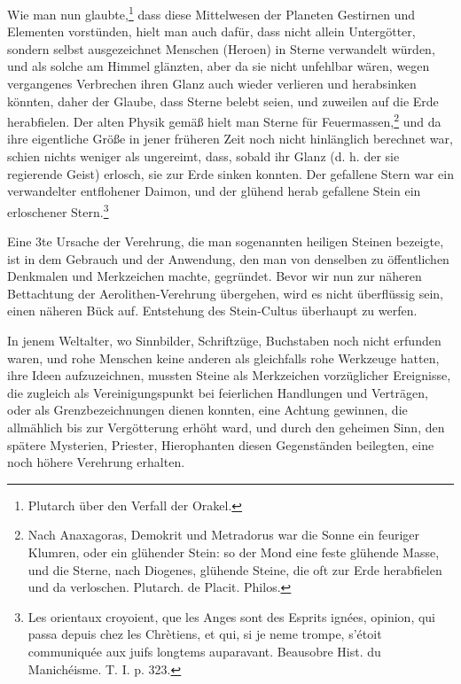 \documentclass[a4paper, 11pt, oneside, polutonikogreek, german]{article}
\begin{document}
Wie man nun glaubte,\footnote{Plutarch über den Verfall der Orakel.} dass diese Mittelwesen der Planeten Gestirnen und Elementen vorstünden, hielt man auch dafür, dass nicht allein Untergötter, sondern selbst ausgezeichnet Menschen (Heroen) in Sterne verwandelt würden, und als solche am Himmel glänzten, aber da sie nicht unfehlbar wären, wegen vergangenes Verbrechen ihren Glanz auch wieder verlieren und herabsinken könnten, daher der Glaube, dass Sterne belebt seien, und zuweilen auf die Erde herabfielen. Der alten Physik gemäß hielt man Sterne für Feuermassen,\footnote{Nach Anaxagoras, Demokrit und Metradorus war die Sonne ein feuriger Klumren, oder ein glühender Stein: so der Mond eine feste glühende Masse, und die Sterne, nach Diogenes, glühende Steine, die oft zur Erde herabfielen und da verloschen. Plutarch. de Placit. Philos.} und da ihre eigentliche Größe in jener früheren Zeit noch nicht hinlänglich berechnet war, schien nichts weniger als ungereimt, dass, sobald ihr Glanz (d. h. der sie regierende Geist) erlosch, sie zur Erde sinken konnten. Der gefallene Stern war ein verwandelter entflohener Daimon, und der glühend herab gefallene Stein ein erloschener Stern.\footnote{Les orientaux croyoient, que les Anges sont des Esprits ignées, opinion, qui passa depuis chez les Chrètiens, et qui, si je neme trompe, s'étoit communiquée aux juifs longtems auparavant. Beausobre Hist. du Manichéisme. T. I. p. 323.}

Eine 3te Ursache der Verehrung, die man sogenannten heiligen Steinen bezeigte, ist in dem Gebrauch und der Anwendung, den man von denselben zu öffentlichen Denkmalen und Merkzeichen machte, gegründet. Bevor wir nun zur näheren Bettachtung der Aerolithen-Verehrung übergehen, wird es nicht überflüssig sein, einen näheren Bück auf. Entstehung des Stein-Cultus überhaupt zu werfen.

In jenem Weltalter, wo Sinnbilder, Schriftzüge, Buchstaben noch nicht erfunden waren, und rohe Menschen keine anderen als gleichfalls rohe Werkzeuge hatten, ihre Ideen aufzuzeichnen, mussten Steine als Merkzeichen vorzüglicher Ereignisse, die zugleich als Vereinigungspunkt bei feierlichen Handlungen und Verträgen, oder als Grenzbezeichnungen dienen konnten, eine Achtung gewinnen, die allmählich bis zur Vergötterung erhöht ward, und durch den geheimen Sinn, den spätere Mysterien, Priester, Hierophanten diesen Gegenständen beilegten, eine noch höhere Verehrung erhalten.
\end{document}
